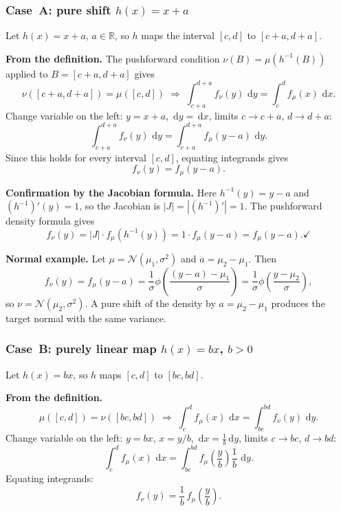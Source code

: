 \documentclass[11pt,a4paper]{article}
\newcommand{\N}{\mathcal{N}}
\newcommand{\dif}{\,\mathrm{d}}
\newcommand{\R}{\mathbb{R}}
\begin{document}
\subsubsection*{Case~A: pure shift $h(x)=x+a$}

Let $h(x) = x+a$, $a\in\R$, so $h$ maps the interval $[c,d]$ to $[c+a,d+a]$.

\medskip\noindent\textbf{From the definition.}
The pushforward condition $\nu(B)=\mu(h^{-1}(B))$ applied to $B=[c+a,d+a]$ gives
\[
  \nu([c+a,d+a]) = \mu([c,d])
  \;\Longrightarrow\;
  \int_{c+a}^{d+a} f_\nu(y)\,\dif y = \int_c^d f_\mu(x)\,\dif x.
\]
Change variable on the left: $y=x+a$, $\dif y=\dif x$, limits $c\to c+a$, $d\to d+a$:
\[
  \int_{c+a}^{d+a} f_\nu(y)\,\dif y
  = \int_{c+a}^{d+a} f_\mu(y-a)\,\dif y.
\]
Since this holds for every interval $[c,d]$, equating integrands gives
\[
  \boxed{f_\nu(y) = f_\mu(y-a).}
\]

\medskip\noindent\textbf{Confirmation by the Jacobian formula.}
Here $h^{-1}(y)=y-a$ and $(h^{-1})'(y)=1$, so the Jacobian is $|J|=|(h^{-1})'|=1$.
The pushforward density formula gives
\[
  f_\nu(y) = |J|\cdot f_\mu(h^{-1}(y)) = 1\cdot f_\mu(y-a) = f_\mu(y-a). \checkmark
\]

\medskip\noindent\textbf{Normal example.}
Let $\mu=\N(\mu_1,\sigma^2)$ and $a=\mu_2-\mu_1$.  Then
\[
  f_\nu(y) = f_\mu(y-a)
           = \frac{1}{\sigma}\phi\!\left(\frac{(y-a)-\mu_1}{\sigma}\right)
           = \frac{1}{\sigma}\phi\!\left(\frac{y-\mu_2}{\sigma}\right),
\]
so $\nu=\N(\mu_2,\sigma^2)$.  A pure shift of the density by $a=\mu_2-\mu_1$
produces the target normal with the same variance. \checkmark

\subsubsection*{Case~B: purely linear map $h(x)=bx$, $b>0$}

Let $h(x) = bx$, so $h$ maps $[c,d]$ to $[bc,bd]$.

\medskip\noindent\textbf{From the definition.}
\[
  \mu([c,d]) = \nu([bc,bd])
  \;\Longrightarrow\;
  \int_c^d f_\mu(x)\,\dif x = \int_{bc}^{bd} f_\nu(y)\,\dif y.
\]
Change variable on the left: $y=bx$, $x=y/b$, $\dif x=\frac{1}{b}\dif y$,
limits $c\to bc$, $d\to bd$:
\[
  \int_c^d f_\mu(x)\,\dif x = \int_{bc}^{bd} f_\mu\!\left(\frac{y}{b}\right)\frac{1}{b}\,\dif y.
\]
Equating integrands:
\[
  \boxed{f_\nu(y) = \frac{1}{b}\,f_\mu\!\left(\frac{y}{b}\right).}
\]
\end{document}
